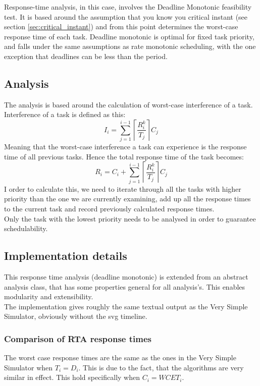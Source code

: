Response-time analysis, in this case, involves the Deadline Monotonic feasibility test. It is based around the assumption that you know you critical instant (see section \ref{sec:critical_instant}) and from this point determines the worst-case response time of each task. Deadline monotonic is optimal for fixed task priority, and falls under the same assumptions as rate monotonic scheduling, with the one exception that deadlines can be less than the period.

\subsection{Analysis}
The analysis is based around the calculation of worst-case interference of a task. Interference of a task is defined as this:
\begin{equation}
I_{i}= \displaystyle\sum\limits_{j=1}^{i-1} \left\lceil \frac{R_{i}^{k}}{T_{j}}\right\rceil C_{j}
\end{equation}
Meaning that the worst-case interference a task can experience is the response time of all previous tasks. Hence the total response time of the task becomes:
\begin{equation}
R_{i}=C_{i} + \displaystyle\sum\limits_{j=1}^{i-1} \left\lceil \frac{R_{i}^{k}}{T_{j}}\right\rceil C_{j}
\end{equation}
I order to calculate this, we need to iterate through all the tasks with higher priority than the one we are currently examining, add up all the response times to the current task and record previously calculated response times.\\
Only the task with the lowest priority needs to be analysed in order to guarantee schedulability.
\subsection{Implementation details}
This response time analysis (deadline monotonic) is extended from an abstract analysis class, that has some properties general for all analysis's. This enables modularity and extensibility.\\
The implementation gives roughly the same textual output as the Very Simple Simulator, obviously without the svg timeline.
\subsubsection{Comparison of RTA response times}
The worst case response times are the same as the ones in the Very Simple Simulator when $T_i = D_i$.
This is due to the fact, that the algorithms are very similar in effect. This hold specifically when $C_i=WCET_i $.

